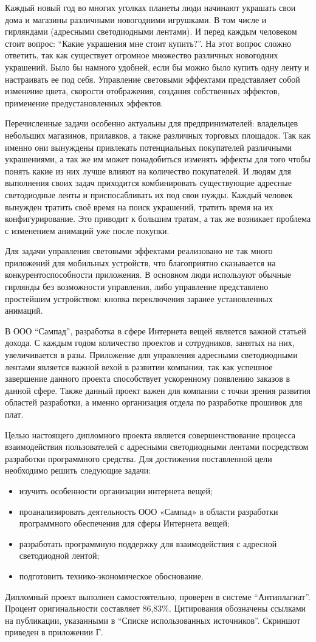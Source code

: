 \label{sec:introduction}

Каждый новый год во многих уголках планеты люди начинают украшать свои дома и магазины различными новогодними игрушками. В том числе и гирляндами (адресными светодиодными лентами). И перед каждым человеком стоит вопрос: \enquote{Какие украшения мне стоит купить?}. На этот вопрос сложно ответить, так как существует огромное множество различных новогодних украшений. Было бы намного удобней, если бы можно было купить одну ленту и настраивать ее под себя. Управление световыми эффектами представляет собой изменение цвета, скорости отображения, создания собственных эффектов, применение предустановленных эффектов.

Перечисленные задачи особенно актуальны для предпринимателей: владельцев небольших магазинов, прилавков, а также различных торговых площадок. Так как именно они вынуждены привлекать потенциальных покупателей различными украшениями, а так же им может понадобиться изменять эффекты для того чтобы понять какие из них лучше влияют на количество покупателей. И людям для выполнения своих задач приходится комбинировать существующие адресные светодиодные ленты и приспосабливать их под свои нужды. Каждый человек вынужден тратить своё время на поиск украшений, тратить время на их конфигурирование. Это приводит к большим тратам, а так же возникает проблема с изменением анимаций уже после покупки.

Для задачи управления световыми эффектами реализовано не так много приложений для мобильных устройств, что благоприятно сказывается на конкурентоспособности приложения. В основном люди используют обычные гирлянды без возможности управления, либо управление представлено простейшим устройством: кнопка переключения заранее установленных анимаций.

В ООО \enquote{Сампад}, разработка в сфере Интернета вещей является важной статьей дохода. С каждым годом количество проектов и сотрудников, занятых на них, увеличивается в разы. Приложение для управления адресными светодиодными лентами является важной вехой в развитии компании, так как успешное завершение данного проекта способствует ускоренному появлению заказов в данной сфере. Также данный проект важен для компании с точки зрения развития областей разработки, а именно организация отдела по разработке прошивок для плат.

Целью настоящего дипломного проекта является совершенствование процесса взаимодействия пользователей с адресными светодиодными лентами посредством разработки программного средства. Для достижения поставленной цели необходимо решить следующие задачи:
\begin{itemize}
\item изучить особенности организации интернета вещей;
\item проанализировать деятельность ООО «Сампад» в области разработки программного обеспечения для сферы Интернета вещей;
\item разработать программную поддержку для взаимодействия с адресной светодиодной лентой;
\item подготовить технико-экономическое обоснование.
\end{itemize}

Дипломный проект выполнен самостоятельно, проверен в системе \enquote{Антиплагиат}. Процент оригинальности составляет  86,83\%. Цитирования обозначены ссылками на публикации, указанными в \enquote{Списке использованных источников}. Скриншот приведен в приложении Г.